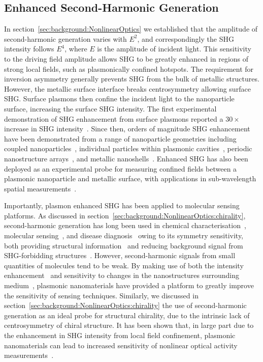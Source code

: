 \subsection{Enhanced Second-Harmonic Generation}\label{sec:background:NonlinearOptics:plasmonic}
In section~\ref{sec:background:NonlinearOptics} we established that the amplitude of second-harmonic generation varies with $E^2$, and correspondingly the SHG intensity follows $E^4$, where $E$ is the amplitude of incident light. This sensitivity to the driving field amplitude allows SHG to be greatly enhanced in regions of strong local fields, such as plasmonically confined hotspots. The requirement for inversion asymmetry generally prevents SHG from the bulk of metallic structures. However, the metallic surface interface breaks centrosymmetry allowing surface SHG. Surface plasmons then confine the incident light to the nanoparticle surface, increasing the surface SHG intensity. 
The first experimental demonstration of SHG enhancement from surface plasmons reported a $30\times$ increase in SHG intensity~\cite{Simon1974}. Since then, orders of magnitude SHG enhancement have been demonstrated from a range of nanoparticle geometries including coupled nanoparticles~\cite{Yildiz2015}, individual particles within plasmonic cavities~\cite{Xiong2016}, periodic nanostructure arrays~\cite{Valev2011b}, and metallic nanoshells~\cite{Pu2010}. Enhanced SHG has also been deployed as an experimental probe for measuring confined fields between a plasmonic nanoparticle and metallic surface, with applications in sub-wavelength spatial measurements~\cite{Shen2015a}. 

Importantly, plasmon enhanced SHG has been applied to molecular sensing platforms. As discussed in section~\ref{sec:background:NonlinearOptics:chirality}, second-harmonic generation has long been used in chemical characterisation~\cite{Chowdhury2016}, molecular sensing~\cite{Tran2017}, and disease diagnosis~\cite{Campagnola2011} owing to its symmetry sensitivity, both providing structural information~\cite{Gott2001} and reducing background signal from SHG-forbidding structures~\cite{Wanapun2010}. 
However, second-harmonic signals from small quantities of molecules tend to be weak. By making use of both the intensity enhancement~\cite{Kai2007, Wang2018} and sensitivity to changes in the nanostructures surrounding medium~\cite{Ghirardini2018}, plasmonic nanomaterials have provided a platform to greatly improve the sensitivity of sensing techniques.
Similarly, we discussed in section~\ref{sec:background:NonlinearOptics:chirality} the use of second-harmonic generation as an ideal probe for structural chirality, due to the intrinsic lack of centrosymmetry of chiral structure. It has been shown that, in large part due to the enhancement in SHG intensity from local field confinement, plasmonic nanomaterials can lead to increased sensitivity of nonlinear optical activity measurements~\cite{Valev2012a, Chen2016, Huttunen2011}.



